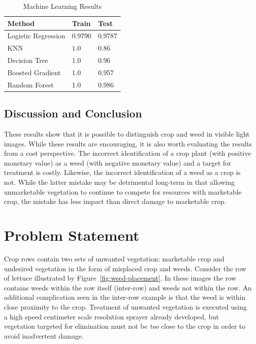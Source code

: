 \documentclass[letterpaper]{article}
\begin{document}
{\renewcommand{\arraystretch}{2}%
\begin{table}[H]
	\centering
    	\caption{Machine Learning Results}
   	 \label{fig:learning}
   	 \begin{tabular}{  l  p{4cm}  p{5cm} }
        	\toprule
		\textbf{Method}      
		& \textbf{Train}   
		& \textbf{Test} \\\midrule
		Logistic Regression
		& 0.9790       
		& 0.9787 \\\hline
		KNN     
		& $1.0$                    
		& $0.86$ \\\hline
		Decision Tree
		& 1.0
		& 0.96 \\\hline
		Boosted Gradient     
		& 1.0
		& 0.957 \\\hline
		Random Forest      
		& 1.0
		& 0.986 \\\hline
       	 \bottomrule
	\end{tabular}
\end{table}

\subsection{Discussion and Conclusion}
These results show that it is possible to distinguish crop and weed in visible light images. While these results are encouraging, it is also worth evaluating the results from a cost perspective. The incorrect identification of a crop plant (with positive monetary value) as a weed (with negative monetary value) and a target for treatment is costly. Likewise, the incorrect identification of a weed as a crop is not. While the latter mistake may be detrimental long-term in that allowing unmarketable vegetation to continue to compete for resources with marketable crop, the mistake has less impact than direct damage to marketable crop.

 
 \newpage

%
%
 
\section{Problem Statement}
Crop rows contain two sets of unwanted vegetation: marketable crop and undesired vegetation in the form of misplaced crop and weeds. Consider the row of lettuce illustrated by Figure~\ref{fig:weed-placement}. In these images the row contains weeds within the row itself (inter-row) and weeds not within the row. An additional complication seen in the inter-row example is that the weed is within close proximity to the crop. 
Treatment of unwanted vegetation is executed using a high speed centimeter scale resolution sprayer already developed, but vegetation targeted for elimination must not be \textit{too} close to the crop in order to avoid inadvertent damage.

}
\end{document}
